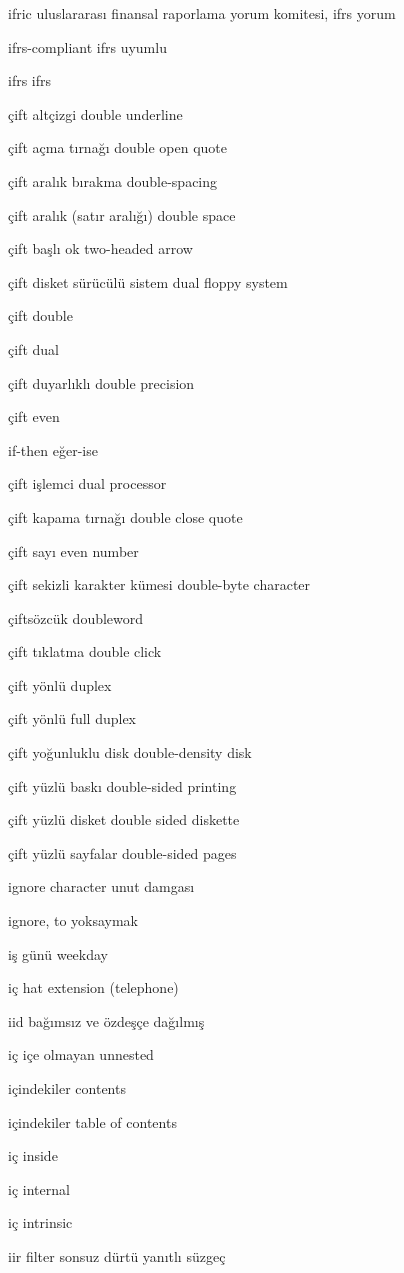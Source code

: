 \documentclass[12pt,fleqn]{article}\usepackage{../../common}
\begin{document}
ifric uluslararası finansal raporlama yorum  komitesi, ifrs yorum

ifrs-compliant ifrs uyumlu

ifrs ifrs

çift altçizgi double underline

çift açma tırnağı double open quote

çift aralık bırakma double-spacing

çift aralık (satır aralığı) double space

çift başlı ok two-headed arrow

çift disket sürücülü sistem dual floppy system

çift double

çift dual

çift duyarlıklı double precision

çift even

if-then eğer-ise

çift işlemci dual processor

çift kapama tırnağı double close quote

çift sayı even number

çift sekizli karakter kümesi double-byte character

çiftsözcük doubleword

çift tıklatma double click

çift yönlü duplex

çift yönlü full duplex

çift yoğunluklu disk double-density disk

çift yüzlü baskı double-sided printing

çift yüzlü disket double sided diskette

çift yüzlü sayfalar double-sided pages

ignore character unut damgası

ignore, to yoksaymak

iş günü weekday

iç hat extension (telephone)

iid bağımsız ve özdeşçe dağılmış

iç içe olmayan unnested

içindekiler contents

içindekiler table of contents

iç inside

iç internal

iç intrinsic

iir filter sonsuz dürtü yanıtlı süzgeç
\end{document}
